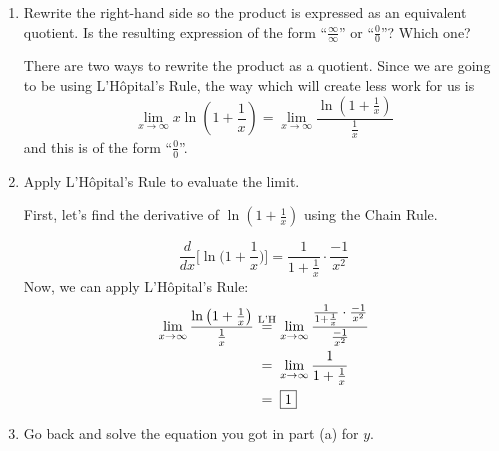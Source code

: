 \documentclass[main]{subfiles}
\begin{document}
\begin{enumerate}
\begin{enumerate}[topsep=0pt]

    \item
    \begin{problem}
      Rewrite the right-hand side so the product is expressed as an equivalent
      quotient. Is the resulting expression of the form ``$\frac{\infty}{\infty}$''
      or ``$\frac{0}{0}$''? Which one?
    \end{problem}


    \begin{solution}
      There are two ways to rewrite the product as a quotient. Since we are
      going to be using L'Hôpital's Rule, the way which will create less work
      for us is 
        \[\lim_{x\to\infty} x \ln\left(1+\frac{1}{x}\right) = 
        \lim_{x\to\infty} \frac{\ln\left(1+\frac{1}{x}\right)}{\frac{1}{x}}\]
      and this is of the form ``$\frac{0}{0}$''.
    \end{solution}


    \item
    \begin{problem}
      Apply L'Hôpital's Rule to evaluate the limit.
    \end{problem}

    \begin{solution}
    First, let's find the derivative of $\ln\left(1+\frac{1}{x}\right)$ using
    the Chain Rule.



    $$\frac{d}{dx}\Big[\ln\Big(1 + \frac{1}{x}\Big)\Big] = \frac{1}{1+\frac{1}{x}} \cdot \frac{-1}{x^2}$$
    Now, we can apply L'Hôpital's Rule:
      \begin{align*}
        \lim_{x\to\infty} \frac{\ln\left(1+\frac{1}{x}\right)}{\frac{1}{x}}
        &\lheq \lim_{x\to\infty} 
        \frac{\frac{1}{1+\frac{1}{x}} \cdot \frac{-1}{x^2}}{\frac{-1}{x^2}} \\
        &\nolheq \lim_{x\to\infty} \frac{1}{1+\frac{1}{x}} \\
        &\nolheq \boxed{1}
      \end{align*}
    \end{solution}

    \pspace{\newpage}
    
    \item
    \begin{problem}
      Go back and solve the equation you got in part (a) for $y$. 
    \end{problem}


\end{enumerate}
\end{enumerate}
\end{document}
